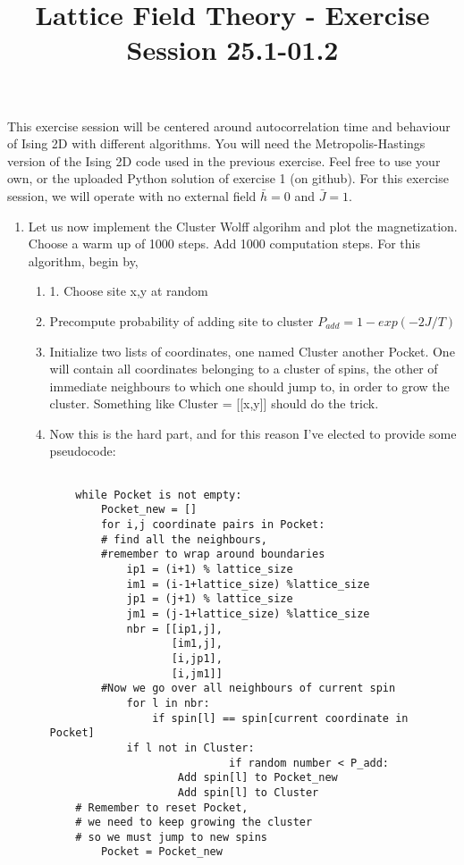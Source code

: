 \documentclass{article}
\title{Lattice Field Theory - Exercise Session 25.1-01.2}
\begin{document}
\maketitle

This exercise session will be centered around autocorrelation time and behaviour of Ising 2D with different algorithms. You will need the Metropolis-Hastings version of the Ising 2D code used in the previous exercise. Feel free to use your own, or the uploaded Python solution of exercise 1 (on github). For this exercise session, we will operate with no external field $\bar{h}=0$ and $\bar{J}=1$. 

\begin{enumerate}

\item  Let us now implement the Cluster Wolff algorihm and plot the magnetization. Choose a warm up of 1000 steps. Add 1000 computation steps. For this algorithm, begin by,
\begin{enumerate}
\item 1. Choose site x,y at random
\item Precompute probability of adding site to cluster $P_{add}= 1- exp(-2J/T)$
\item Initialize two lists of coordinates, one named Cluster another Pocket. One will contain all coordinates belonging to a cluster of spins, the other of immediate neighbours to which one should jump to, in order to grow the cluster. Something like Cluster = [[x,y]] should do the trick.
\item Now this is the hard part, and for this reason I've elected to provide some pseudocode:

\begin{lstlisting}

    while Pocket is not empty:
        Pocket_new = []
        for i,j coordinate pairs in Pocket:
	    # find all the neighbours, 
	    #remember to wrap around boundaries
            ip1 = (i+1) % lattice_size
            im1 = (i-1+lattice_size) %lattice_size
            jp1 = (j+1) % lattice_size
            jm1 = (j-1+lattice_size) %lattice_size
            nbr = [[ip1,j], 
                   [im1,j], 
                   [i,jp1], 
                   [i,jm1]]
	    #Now we go over all neighbours of current spin
            for l in nbr:
                if spin[l] == spin[current coordinate in Pocket] 
			if l not in Cluster:
                    		if random number < P_add:
					Add spin[l] to Pocket_new 
					Add spin[l] to Cluster
	# Remember to reset Pocket, 
	# we need to keep growing the cluster
	# so we must jump to new spins
        Pocket = Pocket_new 
\end{lstlisting}


\end{enumerate}
\end{enumerate}
\end{document}
